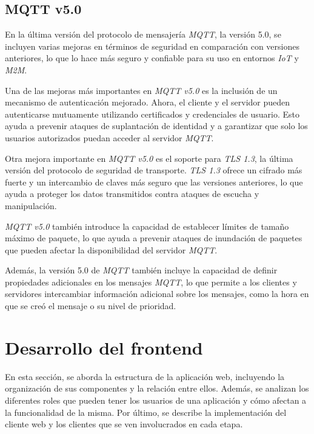\subsection{MQTT v5.0}

En la última versión del protocolo de mensajería \textit{MQTT}, la versión 5.0, se incluyen varias mejoras en términos de seguridad en comparación con versiones anteriores, lo que lo hace más seguro y confiable para su uso en entornos \textit{IoT} y \textit{M2M}.

Una de las mejoras más importantes en \textit{MQTT v5.0} es la inclusión de un mecanismo de autenticación mejorado. Ahora, el cliente y el servidor pueden autenticarse mutuamente utilizando certificados y credenciales de usuario. Esto ayuda a prevenir ataques de suplantación de identidad y a garantizar que solo los usuarios autorizados puedan acceder al servidor \textit{MQTT}.

Otra mejora importante en \textit{MQTT v5.0} es el soporte para \textit{TLS 1.3}, la última versión del protocolo de seguridad de transporte. \textit{TLS 1.3} ofrece un cifrado más fuerte y un intercambio de claves más seguro que las versiones anteriores, lo que ayuda a proteger los datos transmitidos contra ataques de escucha y manipulación.

\textit{MQTT v5.0} también introduce la capacidad de establecer límites de tamaño máximo de paquete, lo que ayuda a prevenir ataques de inundación de paquetes que pueden afectar la disponibilidad del servidor \textit{MQTT}.

Además, la versión 5.0 de \textit{MQTT} también incluye la capacidad de definir propiedades adicionales en los mensajes \textit{MQTT}, lo que permite a los clientes y servidores intercambiar información adicional sobre los mensajes, como la hora en que se creó el mensaje o su nivel de prioridad.


\newpage
\section{Desarrollo del frontend}

En esta sección, se aborda la estructura de la aplicación web, incluyendo la organización de sus componentes y la relación entre ellos. Además, se analizan los diferentes roles que pueden tener los usuarios de una aplicación y cómo afectan a la funcionalidad de la misma. Por último, se describe la implementación del cliente web y los clientes que se ven involucrados en cada etapa. 


